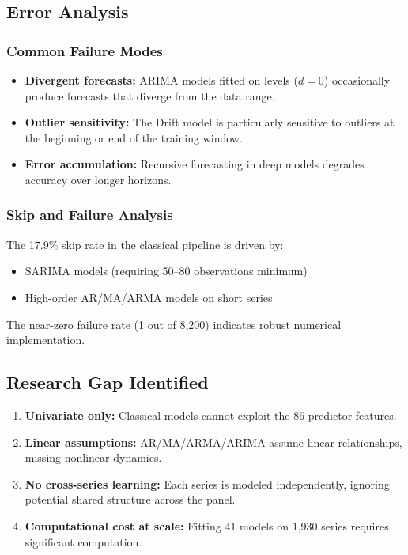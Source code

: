 \subsection{Error Analysis}
\subsubsection{Common Failure Modes}

\begin{itemize}
    \item \textbf{Divergent forecasts:} ARIMA models fitted on levels ($d=0$) occasionally produce forecasts that diverge from the data range.
    \item \textbf{Outlier sensitivity:} The Drift model is particularly sensitive to outliers at the beginning or end of the training window.
    \item \textbf{Error accumulation:} Recursive forecasting in deep models degrades accuracy over longer horizons.
\end{itemize}

\subsubsection{Skip and Failure Analysis}

The 17.9\% skip rate in the classical pipeline is driven by:
\begin{itemize}
    \item SARIMA models (requiring 50--80 observations minimum)
    \item High-order AR/MA/ARMA models on short series
\end{itemize}

The near-zero failure rate (1 out of 8,200) indicates robust numerical implementation.

\subsection{Research Gap Identified}
\begin{enumerate}
    \item \textbf{Univariate only:} Classical models cannot exploit the 86 predictor features.
    \item \textbf{Linear assumptions:} AR/MA/ARMA/ARIMA assume linear relationships, missing nonlinear dynamics.
    \item \textbf{No cross-series learning:} Each series is modeled independently, ignoring potential shared structure across the panel.
    \item \textbf{Computational cost at scale:} Fitting 41 models on 1,930 series requires significant computation.
\end{enumerate}

